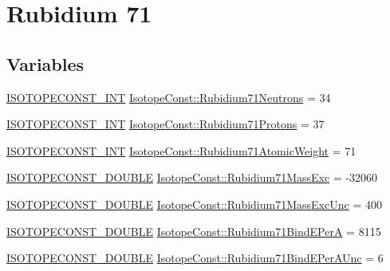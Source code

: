\hypertarget{group___isotope_const-_rubidium-_rb71}{}\section{Rubidium 71}
\label{group___isotope_const-_rubidium-_rb71}
\subsection*{Variables}
\begin{DoxyCompactItemize}
\item 
\mbox{\hyperlink{group___isotope_const-_macros_ga5f18360b3e99483a35c32d789e62621c}{I\+S\+O\+T\+O\+P\+E\+C\+O\+N\+S\+T\+\_\+\+I\+NT}} \mbox{\hyperlink{group___isotope_const-_rubidium-_rb71_ga4bfa3d477d1b1bfdcc3e89b906b71982}{Isotope\+Const\+::\+Rubidium71\+Neutrons}} = 34
\item 
\mbox{\hyperlink{group___isotope_const-_macros_ga5f18360b3e99483a35c32d789e62621c}{I\+S\+O\+T\+O\+P\+E\+C\+O\+N\+S\+T\+\_\+\+I\+NT}} \mbox{\hyperlink{group___isotope_const-_rubidium-_rb71_ga3eeb91cfdcb00b7f84ed44101b7c326a}{Isotope\+Const\+::\+Rubidium71\+Protons}} = 37
\item 
\mbox{\hyperlink{group___isotope_const-_macros_ga5f18360b3e99483a35c32d789e62621c}{I\+S\+O\+T\+O\+P\+E\+C\+O\+N\+S\+T\+\_\+\+I\+NT}} \mbox{\hyperlink{group___isotope_const-_rubidium-_rb71_ga444116d601dbe14035470dba40f194c3}{Isotope\+Const\+::\+Rubidium71\+Atomic\+Weight}} = 71
\item 
\mbox{\hyperlink{group___isotope_const-_macros_ga8f45a7272ce02c0b4c65c44636ed719a}{I\+S\+O\+T\+O\+P\+E\+C\+O\+N\+S\+T\+\_\+\+D\+O\+U\+B\+LE}} \mbox{\hyperlink{group___isotope_const-_rubidium-_rb71_gaefb5711f78302d0f24ff42c8e301771c}{Isotope\+Const\+::\+Rubidium71\+Mass\+Exc}} = -\/32060
\item 
\mbox{\hyperlink{group___isotope_const-_macros_ga8f45a7272ce02c0b4c65c44636ed719a}{I\+S\+O\+T\+O\+P\+E\+C\+O\+N\+S\+T\+\_\+\+D\+O\+U\+B\+LE}} \mbox{\hyperlink{group___isotope_const-_rubidium-_rb71_ga05b777ae7f812d408f5b586af6aec12e}{Isotope\+Const\+::\+Rubidium71\+Mass\+Exc\+Unc}} = 400
\item 
\mbox{\hyperlink{group___isotope_const-_macros_ga8f45a7272ce02c0b4c65c44636ed719a}{I\+S\+O\+T\+O\+P\+E\+C\+O\+N\+S\+T\+\_\+\+D\+O\+U\+B\+LE}} \mbox{\hyperlink{group___isotope_const-_rubidium-_rb71_gac0fa362cbbbffdcf85fa089a11607948}{Isotope\+Const\+::\+Rubidium71\+Bind\+E\+PerA}} = 8115
\item 
\mbox{\hyperlink{group___isotope_const-_macros_ga8f45a7272ce02c0b4c65c44636ed719a}{I\+S\+O\+T\+O\+P\+E\+C\+O\+N\+S\+T\+\_\+\+D\+O\+U\+B\+LE}} \mbox{\hyperlink{group___isotope_const-_rubidium-_rb71_ga73afbfd4751cfc83ca60dcba086f9763}{Isotope\+Const\+::\+Rubidium71\+Bind\+E\+Per\+A\+Unc}} = 6

\end{DoxyCompactItemize}
